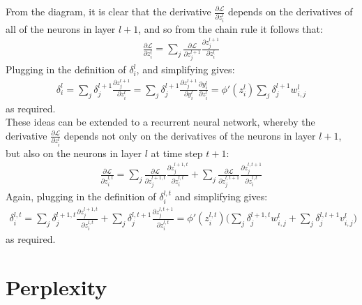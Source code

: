 \documentclass[a4paper, 12pt]{report}
\begin{document}
From the diagram, it is clear that the derivative $\frac{\partial \mathcal{L}}{\partial z_i^l}$ depends on the derivatives of all of the neurons in layer $l + 1$, and so from the chain rule it follows that:
\begin{gather*}
	\frac{\partial \mathcal{L}}{\partial z_i^l} = \sum_j \frac{\partial \mathcal{L}}{\partial z_j^{l + 1}}\frac{\partial z_j^{l + 1}}{\partial z_i^l}
\end{gather*}
Plugging in the definition of $\delta_i^l$, and simplifying gives:
\begin{gather*}
	\delta_i^l = \sum_j \delta_j^{l+1} \frac{\partial z_j^{l+1}}{\partial z_i^l} = \sum_j \delta_j^{l+1} \frac{\partial z_j^{l+1}}{\partial y_i^l} \frac{\partial y_i^l}{\partial z_i^l} = \phi'(z_i^l) \sum_j \delta_j^{l+1} w_{i,j}^l
\end{gather*}
as required. \\

These ideas can be extended to a recurrent neural network, whereby the derivative $\frac{\partial \mathcal{L}}{\partial z_i^l}$ depends not only on the derivatives of the neurons in layer $l + 1$, but also on the neurons in layer $l$ at time step $t + 1$:
\begin{gather*}
	\frac{\partial \mathcal{L}}{\partial z_i^{l, t}} = \sum_j \frac{\partial \mathcal{L}}{\partial z_j^{l + 1, t}}\frac{\partial z_j^{l + 1, t}}{\partial z_i^{l, t}} + \sum_j \frac{\partial \mathcal{L}}{\partial z_j^{l, t + 1}}\frac{\partial z_j^{l, t + 1}}{\partial z_i^{l, t}}
\end{gather*}
Again, plugging in the definition of $\delta_i^{l, t}$ and simplifying gives:
\begin{gather*}
	\delta_i^{l, t} = \sum_j \delta_j^{l+1, t} \frac{\partial z_j^{l+1, t}}{\partial z_i^{l, t}} + \sum_j \delta_j^{l, t + 1} \frac{\partial z_j^{l, t + 1}}{\partial z_i^{l, t}} = \phi'(z_i^{l,t}) \big( \sum_j \delta_j^{l+1,t} w_{i,j}^l + \sum_j \delta_j^{l,t+1} v_{i,j}^l \big)
\end{gather*}
as required.

\chapter{Perplexity} \label{appendix:perplexity}
\end{document}
